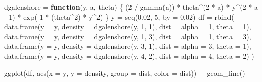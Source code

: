 \documentclass[
]{article}
\newenvironment{Shaded}{\begin{snugshade}}{\end{snugshade}}
\newcommand{\AttributeTok}[1]{\textcolor[rgb]{0.77,0.63,0.00}{#1}}
\newcommand{\ControlFlowTok}[1]{\textcolor[rgb]{0.13,0.29,0.53}{\textbf{#1}}}
\newcommand{\DecValTok}[1]{\textcolor[rgb]{0.00,0.00,0.81}{#1}}
\newcommand{\FloatTok}[1]{\textcolor[rgb]{0.00,0.00,0.81}{#1}}
\newcommand{\FunctionTok}[1]{\textcolor[rgb]{0.00,0.00,0.00}{#1}}
\newcommand{\NormalTok}[1]{#1}
\newcommand{\OtherTok}[1]{\textcolor[rgb]{0.56,0.35,0.01}{#1}}
\newcommand{\SpecialCharTok}[1]{\textcolor[rgb]{0.00,0.00,0.00}{#1}}
\newcommand{\StringTok}[1]{\textcolor[rgb]{0.31,0.60,0.02}{#1}}
\begin{document}
\begin{Shaded}
\begin{Highlighting}[]
\NormalTok{dgalenshore }\OtherTok{=} \ControlFlowTok{function}\NormalTok{(y, a, theta) \{}
\NormalTok{  (}\DecValTok{2} \SpecialCharTok{/} \FunctionTok{gamma}\NormalTok{(a)) }\SpecialCharTok{*}\NormalTok{ theta}\SpecialCharTok{\^{}}\NormalTok{(}\DecValTok{2} \SpecialCharTok{*}\NormalTok{ a) }\SpecialCharTok{*}\NormalTok{ y}\SpecialCharTok{\^{}}\NormalTok{(}\DecValTok{2} \SpecialCharTok{*}\NormalTok{ a }\SpecialCharTok{{-}} \DecValTok{1}\NormalTok{) }\SpecialCharTok{*} \FunctionTok{exp}\NormalTok{(}\SpecialCharTok{{-}}\DecValTok{1} \SpecialCharTok{*}\NormalTok{ (theta}\SpecialCharTok{\^{}}\DecValTok{2}\NormalTok{) }\SpecialCharTok{*}\NormalTok{ y}\SpecialCharTok{\^{}}\DecValTok{2}\NormalTok{)}
\NormalTok{\}}
\NormalTok{y }\OtherTok{=} \FunctionTok{seq}\NormalTok{(}\FloatTok{0.02}\NormalTok{, }\DecValTok{5}\NormalTok{, }\AttributeTok{by =} \FloatTok{0.02}\NormalTok{)}
\NormalTok{df }\OtherTok{=} \FunctionTok{rbind}\NormalTok{(}
  \FunctionTok{data.frame}\NormalTok{(}\AttributeTok{y =}\NormalTok{ y, }\AttributeTok{density =} \FunctionTok{dgalenshore}\NormalTok{(y, }\DecValTok{1}\NormalTok{, }\DecValTok{1}\NormalTok{), }\AttributeTok{dist =} \StringTok{\textquotesingle{}alpha = 1, theta = 1\textquotesingle{}}\NormalTok{),}
  \FunctionTok{data.frame}\NormalTok{(}\AttributeTok{y =}\NormalTok{ y, }\AttributeTok{density =} \FunctionTok{dgalenshore}\NormalTok{(y, }\DecValTok{1}\NormalTok{, }\DecValTok{3}\NormalTok{), }\AttributeTok{dist =} \StringTok{\textquotesingle{}alpha = 1, theta = 3\textquotesingle{}}\NormalTok{),}
  \FunctionTok{data.frame}\NormalTok{(}\AttributeTok{y =}\NormalTok{ y, }\AttributeTok{density =} \FunctionTok{dgalenshore}\NormalTok{(y, }\DecValTok{3}\NormalTok{, }\DecValTok{1}\NormalTok{), }\AttributeTok{dist =} \StringTok{\textquotesingle{}alpha = 3, theta = 1\textquotesingle{}}\NormalTok{),}
  \FunctionTok{data.frame}\NormalTok{(}\AttributeTok{y =}\NormalTok{ y, }\AttributeTok{density =} \FunctionTok{dgalenshore}\NormalTok{(y, }\DecValTok{4}\NormalTok{, }\DecValTok{2}\NormalTok{), }\AttributeTok{dist =} \StringTok{\textquotesingle{}alpha = 4, theta = 2\textquotesingle{}}\NormalTok{)}
\NormalTok{)}

\FunctionTok{ggplot}\NormalTok{(df, }\FunctionTok{aes}\NormalTok{(}\AttributeTok{x =}\NormalTok{ y, }\AttributeTok{y =}\NormalTok{ density, }\AttributeTok{group =}\NormalTok{ dist, }\AttributeTok{color =}\NormalTok{ dist)) }\SpecialCharTok{+}
  \FunctionTok{geom\_line}\NormalTok{()}
\end{Highlighting}
\end{Shaded}
\end{document}
